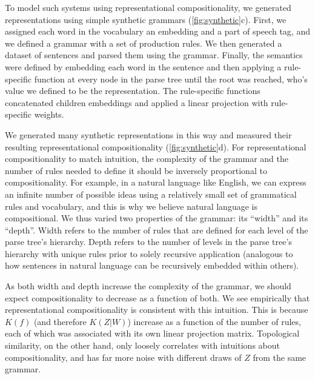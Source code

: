 \documentclass{article} %
\newcommand{\comp}{representational compositionality}
\begin{document}
To model such systems using \comp{}, we generated representations using simple synthetic grammars (\cref{fig:synthetic}c). First, we assigned each word in the vocabulary an embedding and a part of speech tag, and we defined a grammar with a set of production rules. We then generated a dataset of sentences and parsed them using the grammar. Finally, the semantics were defined by embedding each word in the sentence and then applying a rule-specific function at every node in the parse tree until the root was reached, who's value we defined to be the representation. The rule-specific functions concatenated children embeddings and applied a linear projection with rule-specific weights.

We generated many synthetic representations in this way and measured their resulting \comp{} (\cref{fig:synthetic}d). For \comp{} to match intuition, the complexity of the grammar and the number of rules needed to define it should be inversely proportional to compositionality. For example, in a natural language like English, we can express an infinite number of possible ideas using a relatively small set of grammatical rules and vocabulary, and this is why we believe natural language is compositional. We thus varied two properties of the grammar: its ``width'' and its ``depth''. Width refers to the number of rules that are defined for each level of the parse tree's hierarchy. Depth refers to the number of levels in the parse tree's hierarchy with unique rules prior to solely recursive application (analogous to how sentences in natural language can be recursively embedded within others).

As both width and depth increase the complexity of the grammar, we should expect compositionality to decrease as a function of both. We see empirically that \comp{} is consistent with this intuition. This is because $K(f)$ (and therefore $K(Z|W)$) increase as a function of the number of rules, each of which was associated with its own linear projection matrix. Topological similarity, on the other hand, only loosely correlates with intuitions about compositionality, and has far more noise with different draws of $Z$ from the same grammar.

\end{document}
